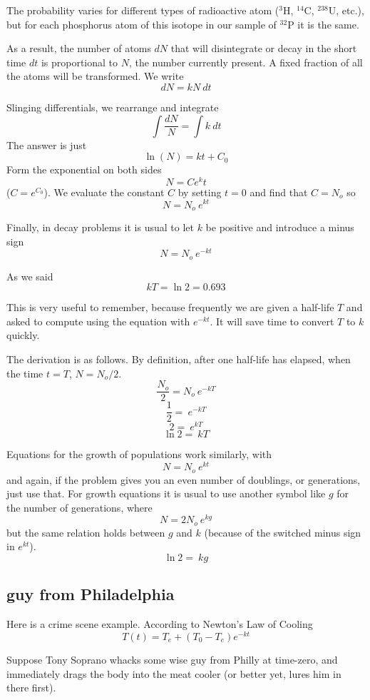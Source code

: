 \documentclass[11pt, oneside]{article}
\begin{document}
The probability varies for different types of radioactive atom (${}^{3}$H, ${}^{14}$C, ${}^{238}$U, etc.), but for each phosphorus atom of this isotope in our sample of ${}^{32}$P it is the same.  

As a result, the number of atoms $dN$ that will disintegrate or decay in the short time $dt$ is proportional to $N$, the number currently present.  A fixed fraction of all the atoms will be transformed.  We write
\[ dN = k N \ dt \]

Slinging differentials, we rearrange and integrate
\[ \int \frac{dN}{N} = \int k \ dt \]
The answer is just
\[ \ln(N) = kt + C_0 \]
Form the exponential on both sides
\[ N = Ce^kt \]
($C = e^{C_0}$).  We evaluate the constant $C$ by setting $t=0$ and find that $C = N_o$ so
\[ N = N_o \ e^{kt} \]

Finally, in decay problems it is usual to let $k$ be positive and introduce a minus sign
\[ N = N_o \ e^{-kt} \]

As we said
\[ kT = \ln 2 = 0.693 \]

This is very useful to remember, because frequently we are given a half-life $T$ and asked to compute using the  equation with $e^{-kt}$.  It will save time to convert $T$ to $k$ quickly.  

The derivation is as follows.  By definition, after one half-life has elapsed, when the time $t = T$, $N = N_o/2$.
\[ \frac{N_o}{2} = N_o \ e^{-kT} \]
\[ \frac{1}{2} =  \ e^{-kT} \]
\[ 2 =  \ e^{kT} \]
\[ \ln 2 =  \ kT \]

Equations for the growth of populations work similarly, with 
\[ N = N_o \ e^{kt} \]
and again, if the problem gives you an even number of doublings, or generations, just use that.  For growth equations it is usual to use another symbol like $g$ for the number of generations, where
\[ N = 2N_o \ e^{kg} \]
but the same relation holds between $g$ and $k$ (because of the switched minus sign in $e^{kt}$).
\[ \ln 2 =  \ kg \]

\subsection*{guy from Philadelphia}

Here is a crime scene example.  According to Newton's Law of Cooling
\[ T(t) = T_e + (T_0 - T_e) e^{-kt} \]

Suppose Tony Soprano whacks some wise guy from Philly at time-zero, and immediately drags the body into the meat cooler (or better yet, lures him in there first).  
\end{document}
